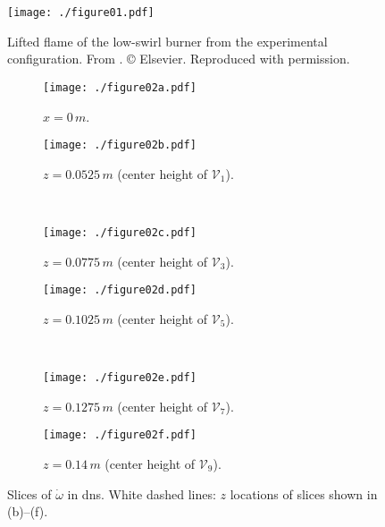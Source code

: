 \documentclass[review]{elsarticle}
\begin{document}
\clearpage\newpage
\renewcommand\thefigure{\arabic{figure}}
\renewcommand\thetable{\arabic{table}}
\begin{figure}[!tbp]%
  \centering%
  \texttt{[image: ./figure01.pdf]}%
  \caption{Lifted flame of the low-swirl burner from the experimental configuration. From \citet{Day2012}. \copyright{} Elsevier. Reproduced with permission.}\label{fig:exp_lsb}%
\end{figure}%

\clearpage\newpage
\begin{figure}[!tbp]%
  \centering%
  \begin{subfigure}[t]{0.48\textwidth}%
    \texttt{[image: ./figure02a.pdf]}%
    \caption{$x=0\,\unit{m}$.}%
  \end{subfigure}\hfill%
  \begin{subfigure}[t]{0.48\textwidth}%
    \texttt{[image: ./figure02b.pdf]}%
    \caption{$z=0.0525\,\unit{m}$ (center height of $\mathcal{V}_{1}$).}%
  \end{subfigure}\\%
  \begin{subfigure}[t]{0.48\textwidth}%
    \texttt{[image: ./figure02c.pdf]}%
    \caption{$z=0.0775\,\unit{m}$ (center height of $\mathcal{V}_{3}$).}%
 \end{subfigure}\hfill%
  \begin{subfigure}[t]{0.48\textwidth}%
    \texttt{[image: ./figure02d.pdf]}%
    \caption{$z=0.1025\,\unit{m}$ (center height of $\mathcal{V}_{5}$).}%
  \end{subfigure}\\%
  \begin{subfigure}[t]{0.48\textwidth}%
    \texttt{[image: ./figure02e.pdf]}%
    \caption{$z=0.1275\,\unit{m}$ (center height of $\mathcal{V}_{7}$).}%
  \end{subfigure}\hfill%
  \begin{subfigure}[t]{0.48\textwidth}%
    \texttt{[image: ./figure02f.pdf]}%
    \caption{$z=0.14\,\unit{m}$ (center height of $\mathcal{V}_{9}$).}%
  \end{subfigure}
  \caption{Slices of $\dot{\omega}$ in \gls{dns}. White dashed lines: $z$ locations of slices shown in (b)--(f).}\label{fig:dns}%
\end{figure}%
\end{document}

